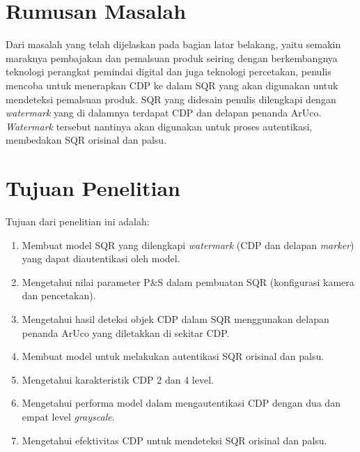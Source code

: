 \section{Rumusan Masalah}
Dari masalah yang telah dijelaskan pada bagian latar belakang, yaitu semakin maraknya pembajakan dan pemalsuan produk seiring dengan berkembangnya teknologi
perangkat pemindai digital dan juga teknologi percetakan, penulis mencoba untuk menerapkan CDP ke dalam SQR yang akan digunakan untuk mendeteksi pemalsuan
produk. SQR yang didesain penulis dilengkapi dengan \emph{watermark} yang di dalamnya terdapat CDP dan delapan penanda ArUco. \emph{Watermark} tersebut
nantinya akan digunakan untuk proses autentikasi, membedakan SQR orisinal dan palsu.

\section{Tujuan Penelitian}Tujuan dari penelitian ini adalah:
\begin{enumerate}
    \item Membuat model SQR yang dilengkapi \emph{watermark} (CDP dan delapan \emph{marker}) yang dapat diautentikasi oleh model.
    \item Mengetahui nilai parameter P\&S dalam pembuatan SQR (konfigurasi kamera dan pencetakan).
    \item Mengetahui hasil deteksi objek CDP dalam SQR menggunakan delapan penanda ArUco yang diletakkan di sekitar CDP.
    \item Membuat model untuk melakukan autentikasi SQR orisinal dan palsu.
    \item Mengetahui karakteristik CDP 2 dan 4 level.
    \item Mengetahui performa model dalam mengautentikasi CDP dengan dua dan empat level \textit{grayscale}.
    \item Mengetahui efektivitas CDP untuk mendeteksi SQR orisinal dan palsu.
\end{enumerate}

